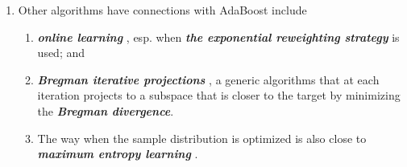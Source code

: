 \documentclass[11pt]{article}
\begin{document}
\begin{itemize}
\begin{remark}
\begin{enumerate}
\item Other algorithms have connections with AdaBoost include 
\begin{enumerate}
\item \emph{\textbf{online learning}} \citep{cesa2006prediction}, esp. when \emph{\textbf{the exponential reweighting strategy}} is used; and
\item \emph{\textbf{Bregman iterative projections}} \citep{gabriel2019computational}, a generic algorithms that at each iteration projects to a subspace that is closer to the target by minimizing the \emph{\textbf{Bregman divergence}}.
\item The way when the sample distribution is optimized is also close to \emph{\textbf{maximum entropy learning}} \citep{thomas2006elements}.
\end{enumerate}
\end{enumerate}
\end{remark}
\end{itemize}
\end{document}
